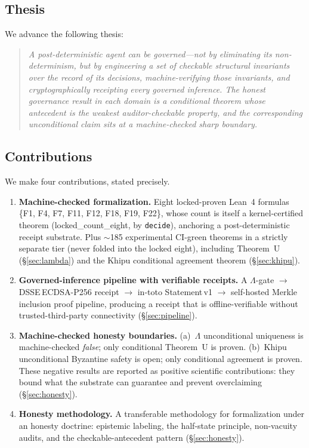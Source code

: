 \documentclass[11pt,letterpaper]{article}
\newcommand{\lean}[1]{{\small\ttfamily #1}}
\theoremstyle{definition}
\newcommand{\Lam}{\Lambda}
\begin{document}
\subsection{Thesis}

We advance the following thesis:

\begin{quote}
\emph{A post-deterministic agent can be governed---not by eliminating
its non-determinism, but by engineering a set of checkable structural
invariants over the record of its decisions, machine-verifying those
invariants, and cryptographically receipting every governed inference.
The honest governance result in each domain is a conditional theorem
whose antecedent is the weakest auditor-checkable property, and the
corresponding unconditional claim sits at a machine-checked sharp
boundary.}
\end{quote}

\subsection{Contributions}

We make four contributions, stated precisely.

\begin{enumerate}[label=\textbf{C\arabic*.}]
\item \textbf{Machine-checked formalization.} Eight locked-proven Lean~4
  formulas \{F1, F4, F7, F11, F12, F18, F19, F22\}, whose count is itself a
  kernel-certified theorem (\lean{locked\_count\_eight}, by \texttt{decide}),
  anchoring a post-deterministic receipt substrate.
  Plus $\sim$185 experimental CI-green theorems in a strictly separate
  tier (never folded into the locked eight), including Theorem~U
  (\S\ref{sec:lambda}) and the Khipu conditional agreement theorem
  (\S\ref{sec:khipu}).

\item \textbf{Governed-inference pipeline with verifiable receipts.}
  A $\Lam$-gate $\to$ DSSE\,ECDSA-P256 receipt $\to$ in-toto
  Statement\,v1 $\to$ self-hosted Merkle inclusion proof pipeline,
  producing a receipt that is offline-verifiable without trusted-third-party
  connectivity (\S\ref{sec:pipeline}).

\item \textbf{Machine-checked honesty boundaries.}
  (a)~$\Lam$ unconditional uniqueness is machine-checked \emph{false};
  only conditional Theorem~U is proven.
  (b)~Khipu unconditional Byzantine safety is open; only conditional
  agreement is proven.
  These negative results are reported as positive scientific contributions:
  they bound what the substrate can guarantee and prevent overclaiming
  (\S\ref{sec:honesty}).

\item \textbf{Honesty methodology.}
  A transferable methodology for formalization under an honesty doctrine:
  epistemic labeling, the half-state principle, non-vacuity audits, and
  the checkable-antecedent pattern (\S\ref{sec:honesty}).
\end{enumerate}
\end{document}

